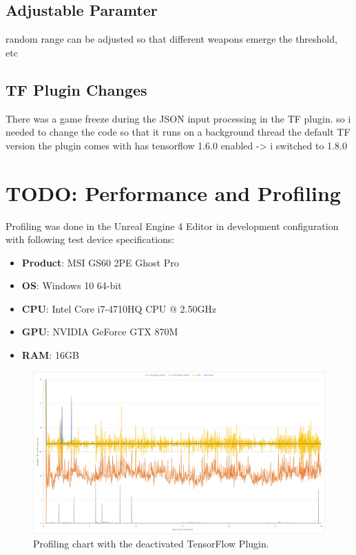 \documentclass[MGS,Master,english]{twbook}%
\begin{document}
\subsection{Adjustable Paramter}
random range can be adjusted so that different weapons emerge
the threshold, etc

\subsection{\ac{TF} Plugin Changes}
There was a game freeze during the JSON input processing in the TF plugin. so i needed to change the code so that it runs on a background thread
the default TF version the plugin comes with has tensorflow 1.6.0 enabled -> i switched to 1.8.0


\section{TODO: Performance and Profiling}
Profiling was done in the Unreal Engine 4 Editor in development configuration with following test device specifications:
\begin{itemize}
	\item \textbf{Product}: MSI GS60 2PE Ghost Pro
	\item \textbf{OS}: Windows 10 64-bit
	\item \textbf{CPU}: Intel Core i7-4710HQ CPU @ 2.50GHz
	\item \textbf{GPU}: NVIDIA GeForce GTX 870M
	\item \textbf{\ac{RAM}}: 16GB
\end{itemize}

\begin{figure}[!htbp]
	\centering
	\includegraphics[width=1.0\linewidth]{PICs/Profiling/deactivated_plugin}
	\caption{Profiling chart with the deactivated TensorFlow Plugin.}
\end{figure}
\end{document}
